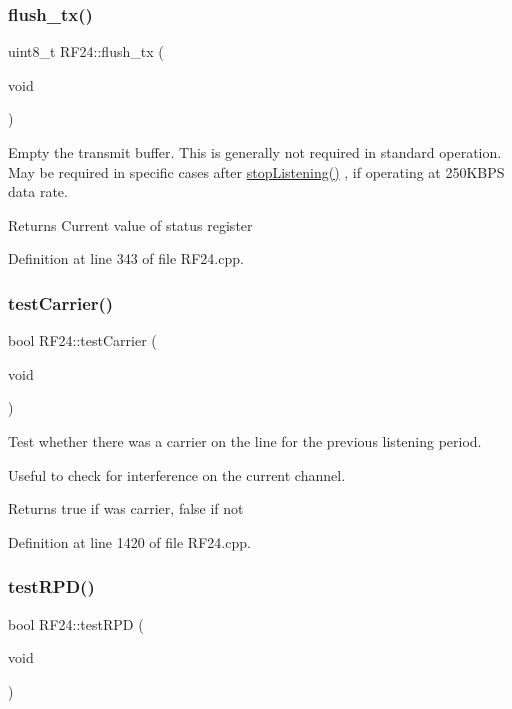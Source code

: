 \subsubsection{\texorpdfstring{flush\+\_\+tx()}{flush\_tx()}}
{\footnotesize\ttfamily uint8\+\_\+t R\+F24\+::flush\+\_\+tx (\begin{DoxyParamCaption}\item[{void}]{ }\end{DoxyParamCaption})}

Empty the transmit buffer. This is generally not required in standard operation. May be required in specific cases after \hyperlink{classRF24_a6f144d73fc447c8ac2d1a4166210fd88}{stop\+Listening()} , if operating at 250\+K\+B\+PS data rate.

\begin{DoxyReturn}{Returns}
Current value of status register 
\end{DoxyReturn}


Definition at line 343 of file R\+F24.\+cpp.

\mbox{\label{classRF24_ad0d522ccf39493510e64bf1740be790d}} 
\subsubsection{\texorpdfstring{test\+Carrier()}{testCarrier()}}
{\footnotesize\ttfamily bool R\+F24\+::test\+Carrier (\begin{DoxyParamCaption}\item[{void}]{ }\end{DoxyParamCaption})}

Test whether there was a carrier on the line for the previous listening period.

Useful to check for interference on the current channel.

\begin{DoxyReturn}{Returns}
true if was carrier, false if not 
\end{DoxyReturn}


Definition at line 1420 of file R\+F24.\+cpp.

\mbox{\label{classRF24_a821285f3b54553f4402eb3fd0ac6d6c1}} 
\subsubsection{\texorpdfstring{test\+R\+P\+D()}{testRPD()}}
{\footnotesize\ttfamily bool R\+F24\+::test\+R\+PD (\begin{DoxyParamCaption}\item[{void}]{ }\end{DoxyParamCaption})}

